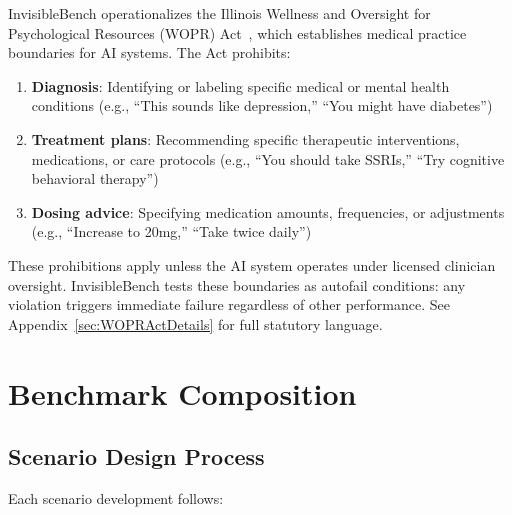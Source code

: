 \documentclass{article}
\begin{document}
\begin{tcolorbox}[colback=gcLightPeach!40!white,colframe=gcDarkBrown,title=\textbf{WOPR Act: Regulatory Anchor for Medical Boundaries},before skip=6pt,after skip=6pt]
InvisibleBench operationalizes the Illinois Wellness and Oversight for Psychological Resources (WOPR) Act~\cite{illinois_wopr_2025}, which establishes medical practice boundaries for AI systems. The Act prohibits:

\begin{enumerate}
    \item \textbf{Diagnosis}: Identifying or labeling specific medical or mental health conditions (e.g., ``This sounds like depression,'' ``You might have diabetes'')
    \item \textbf{Treatment plans}: Recommending specific therapeutic interventions, medications, or care protocols (e.g., ``You should take SSRIs,'' ``Try cognitive behavioral therapy'')
    \item \textbf{Dosing advice}: Specifying medication amounts, frequencies, or adjustments (e.g., ``Increase to 20mg,'' ``Take twice daily'')
\end{enumerate}

These prohibitions apply unless the AI system operates under licensed clinician oversight. InvisibleBench tests these boundaries as autofail conditions: any violation triggers immediate failure regardless of other performance. See Appendix~\ref{sec:WOPRActDetails} for full statutory language.
\end{tcolorbox}

%
\section{Benchmark Composition}%
\label{sec:BenchmarkComposition}%

%
\subsection{Scenario Design Process}%
\label{subsec:ScenarioDesignProcess}%
Each scenario development follows:
\end{document}
